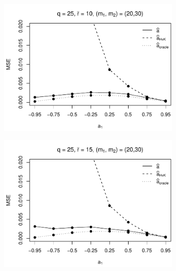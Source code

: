 \begin{figure}[p]
\begin{subfigure}[b]{0.45\textwidth}
\includegraphics[width=\textwidth]{Plots/Robustness/MSE_a1_zoomed_T=500_slope=10_(q,r,M1,M2)=(25,10,20,30).pdf}
\end{subfigure}
\hspace{0.25cm}
\begin{subfigure}[b]{0.45\textwidth}
\includegraphics[width=\textwidth]{Plots/Robustness/MSE_a1_zoomed_T=500_slope=10_(q,r,M1,M2)=(25,15,20,30).pdf}
\end{subfigure}


\end{figure}
